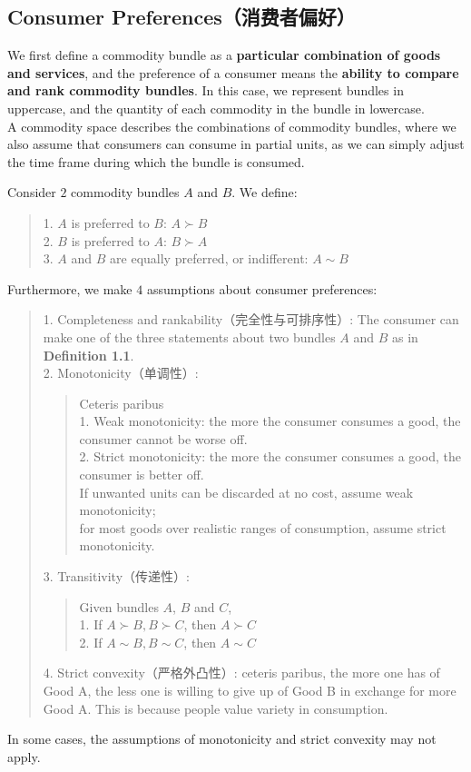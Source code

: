 \subsection{Consumer Preferences（消费者偏好）}
We first define a commodity bundle as a \textbf{particular combination of goods and services}, and the preference of a consumer means the \textbf{ability to compare and rank commodity bundles}. In this case, we represent bundles in uppercase, and the quantity of each commodity in the bundle in lowercase. \\
A commodity space describes the combinations of commodity bundles, where we also assume that consumers can consume in partial units, as we can simply adjust the time frame during which the bundle is consumed.
\begin{definition}
    Consider $2$ commodity bundles $A$ and $B$. We define:
    \begin{quote}
        1. $A$ is preferred to $B$: $A \succ B$ \\
        2. $B$ is preferred to $A$: $B \succ A$ \\
        3. $A$ and $B$ are equally preferred, or indifferent: $A \sim B$
    \end{quote}
\end{definition}
Furthermore, we make $4$ assumptions about consumer preferences:
\begin{quote}
    1. Completeness and rankability（完全性与可排序性）: The consumer can make one of the three statements about two bundles $A$ and $B$ as in \textbf{Definition 1.1}. \\
    2. Monotonicity（单调性）:
    \begin{quote}
        Ceteris paribus \\
        1. Weak monotonicity: the more the consumer consumes a good, the consumer cannot be worse off. \\
        2. Strict monotonicity: the more the consumer consumes a good, the consumer is better off. \\
        If unwanted units can be discarded at no cost, assume weak monotonicity; \\
        for most goods over realistic ranges of consumption, assume strict monotonicity.
    \end{quote}
    3. Transitivity（传递性）: 
    \begin{quote}
        Given bundles $A$, $B$ and $C$, \\
        1. If $A \succ B, B \succ C$, then $A \succ C$ \\
        2. If $A \sim B, B \sim C$, then $A \sim C$
    \end{quote}
    4. Strict convexity（严格外凸性）: ceteris paribus, the more one has of Good A, the less one is willing to give up of Good B in exchange for more Good A. This is because people value variety in consumption.
\end{quote}
In some cases, the assumptions of monotonicity and strict convexity may not apply.

